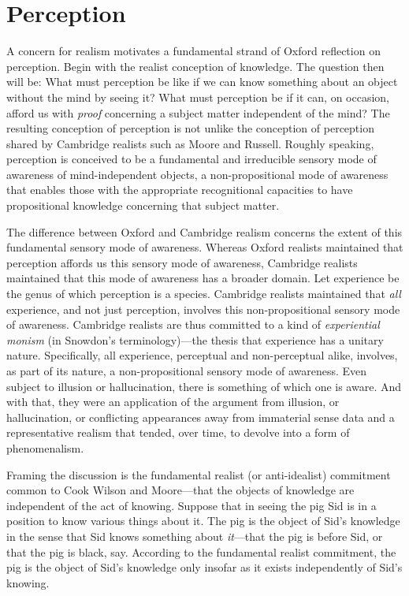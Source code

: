 
\section{Perception} %
\label{sec:perception}

A concern for realism motivates a fundamental strand of Oxford reflection on perception. Begin with the realist conception of knowledge.  The question then will be: What must perception be like if we can know something about an object without the mind by seeing it? What must perception be if it can, on occasion, afford us with \emph{proof} concerning a subject matter independent of the mind? The resulting conception of perception is not unlike the conception of perception shared by Cambridge realists such as Moore and Russell. Roughly speaking, perception is conceived to be a fundamental and irreducible sensory mode of awareness of mind-independent objects, a non-propositional mode of awareness that enables those with the appropriate recognitional capacities to have propositional knowledge concerning that subject matter. 

The difference between Oxford and Cambridge realism concerns the extent of this fundamental sensory mode of awareness. Whereas Oxford realists maintained that perception affords us this sensory mode of awareness, Cambridge realists maintained that this mode of awareness has a broader domain. Let experience be the genus of which perception is a species. Cambridge realists maintained that \emph{all} experience, and not just perception, involves this non-propositional sensory mode of awareness. Cambridge realists are thus committed to a kind of \emph{experiential monism} (in Snowdon's \citeyear{Snowdon:2008oz} terminology)---the thesis that experience has a unitary nature. Specifically, all experience, perceptual and non-perceptual alike, involves, as part of its nature, a non-propositional sensory mode of awareness. Even subject to illusion or hallucination, there is something of which one is aware. And with that, they were an application of the argument from illusion, or hallucination, or conflicting appearances away from immaterial sense data and a representative realism that tended, over time, to devolve into a form of phenomenalism.

Framing the discussion is the fundamental realist (or anti-idealist) commitment common to Cook Wilson and Moore---that the objects of knowledge are independent of the act of knowing. Suppose that in seeing the pig Sid is in a position to know various things about it. The pig is the object of Sid's knowledge in the sense that Sid knows something about \emph{it}---that the pig is before Sid, or that the pig is black, say. According to the fundamental realist commitment, the pig is the object of Sid's knowledge only insofar as it exists independently of Sid's knowing. 

